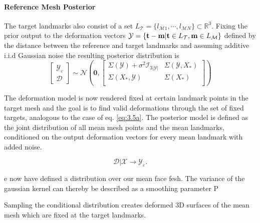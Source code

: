 \paragraph{Reference Mesh Posterior}
The target landmarks also consist of a set $L_{\mathcal{T}} = \{l_{\mathcal{M}1},\cdots, l_{\mathcal{M}N}\} \subset \mathbb{R}^3$. 
Fixing the prior output to the deformation vectors $\mathcal{Y}=\{\textbf{t}-\textbf{m}\vert \textbf{t} \in L_{\mathcal{T}}, \textbf{m} \in L_{\mathcal{M}}\}$ defined by the distance between the reference and target landmarks and assuming additive i.i.d Gaussian noise the resulting posterior distribution is
\begin{equation}
    \begin{bmatrix}\mathcal{Y_{\varepsilon}}\\\mathcal{D}\end{bmatrix}
\sim \mathcal{N}\left(\textbf{0},
\begin{bmatrix}
    \Sigma(\mathcal{Y}) + \sigma^2\mathcal{I}_{3\left|\mathcal{Y} \right|} & \Sigma(\mathcal{Y},X_{*})\\
    \Sigma(X_{*},\mathcal{Y}) & \Sigma(X_{*})\\
\end{bmatrix}
\right)
\end{equation}

The deformation model is now rendered fixed at certain landmark points in the target mesh and the goal is to find valid deformations through the set of fixed targets, analogous to the case of eq. \ref{eq:3.5a}. The posterior model is defined as the joint distribution of all mean mesh points and the mean landmarks, conditioned on the output deformation vectors for every mean landmark with added noise.
\begin{center}
\begin{equation}
    \mathcal{D}\vert \mathcal{X} \rightarrow \mathcal{Y}_{\varepsilon}. 
\end{equation}
\end{center}
e now have defined a distribution over our mean face fesh. The variance of the gaussian kernel can thereby be described as a smoothing parameter
P

Sampling the conditional distribution creates deformed 3D surfaces of the mean mesh which are fixed at the target landmarks.

